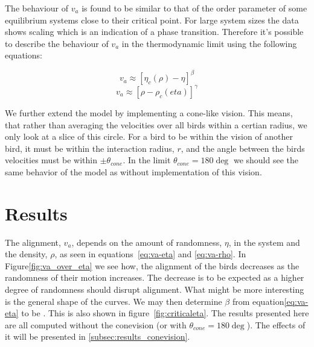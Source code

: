 \documentclass[twoside,twocolumn]{article}
\begin{document}
The behaviour of $v_a$ is found to be similar to that of the order parameter of some equilibrium systems close to their critical point. For large system sizes the data shows scaling which is an indication of a phase transition. Therefore it's possible to describe the behaviour of $v_a$ in the thermodynamic limit using the following equations:









\begin{equation}
  \label{eq:va-eta}
  v_a \approx[\eta_c(\rho)-\eta]^\beta 
\end{equation}
\begin{equation}
  \label{eq:va-rho}
  v_a \approx[\rho-\rho_c(eta)]^\gamma
\end{equation}

We further extend the model by implementing a cone-like vision. This means, that rather than averaging the velocities over all birds within a certian radius, we only look at a slice of this circle. For a bird to be within the vision of another bird, it must be within the interaction radius, $r$, and the angle between the birds velocities must be within $\pm \theta_{cone}$. In the limit $\theta_{cone} = 180 \deg$ we should see the same behavior of the model as without implementation of this vision.

\section{Results}

The alignment, $v_a$, depends on the amount of randomness, $\eta$, in the system and the density, $\rho$, as seen in equations~\eqref{eq:va-eta} and \eqref{eq:va-rho}. In Figure\ref{fig:va_over_eta} we see how, the alignment of the birds decreases as the randomness of their motion increases. The decrease is to be expected as a higher degree of randomness should disrupt alignment. What might be more interesting is the general shape of the curves. We may then determine $\beta$ from equation\eqref{eq:va-eta} to be  . This is also shown in figure~\ref{fig:criticaleta}. The results presented here are all computed without the conevision (or with $\theta_{cone} = 180\deg$). The effects of it will be presented in \ref{subsec:results_conevision}.
\end{document}
